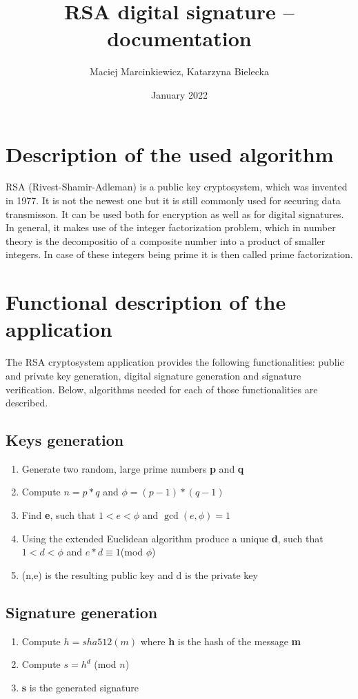 \documentclass{article}
\title{ RSA digital signature -- documentation}
\author{Maciej Marcinkiewicz, Katarzyna Bielecka}
\date{\nth{20} January 2022}
\begin{document}
\maketitle

\section{Description of the used algorithm}
RSA (Rivest-Shamir-Adleman) is a public key cryptosystem, which was invented in 1977. It is not the newest one but it is still commonly used for securing data transmisson.
It can be used both for encryption as well as for digital signatures. In general, it makes use of the integer factorization problem, which in number theory is the decompositio of a composite number into a product of smaller integers. In case of these integers being prime it is then called prime factorization.  

\section{Functional description of the application}
The RSA cryptosystem application provides the following functionalities:
public and private key generation, digital signature generation and signature verification.
Below, algorithms needed for each of those functionalities are described.

\subsection{Keys generation}
\begin{enumerate}
    \item Generate two random, large prime numbers \textbf{p} and \textbf{q}
    \item Compute $ n = p*q $  and $ \phi = (p - 1)*(q - 1) $
    \item Find \textbf{e}, such that  $ 1 < e < \phi$ and $\gcd(e,\phi) = 1 $
    \item Using the extended Euclidean algorithm produce a unique \textbf{d}, such that $ 1 < d < \phi $  and $ e*d \equiv  1 $(mod $\phi$)  
    \item (n,e) is the resulting public key and d is the private key
\end{enumerate}

\subsection{Signature generation}
\begin{enumerate}
    \item Compute $  h = sha512(m) $ where \textbf{h} is the hash of the message \textbf{m}  
    \item Compute $ s = h^d $ (mod $n$)
    \item \textbf{s} is the generated signature
\end{enumerate}
\end{document}
